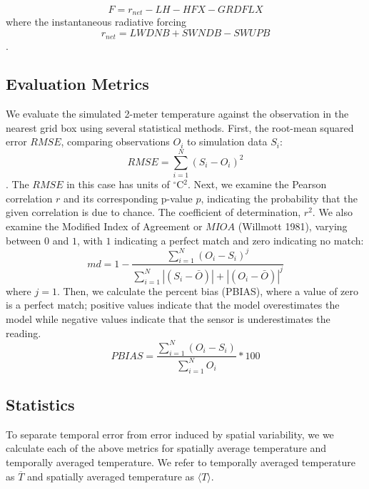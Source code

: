 \documentclass[draft,linenumbers]{agujournal}
\begin{document}
\begin{equation}
F= r_{net} -LH - HFX - GRDFLX
\end{equation}
where the instantaneous radiative forcing $$r_{net}=LWDNB + SWNDB-SWUPB$$. 
  
\subsection{Evaluation Metrics}

We evaluate the simulated 2-meter temperature against the observation in the nearest grid box using several statistical methods. First, the root-mean squared error $RMSE$, comparing observations $O_i$ to simulation data $S_i$:  
\begin{equation}%
RMSE = \sum_{i=1}^{N} \left(S_i - O_i\right)^2
\end{equation}
. The $RMSE$ in this case has units of $^\circ$C$^2$. Next, we examine the Pearson correlation $r$ and its corresponding p-value $p$, indicating the probability that the given correlation is due to chance. The coefficient of determination, $r^2$. We also examine the Modified Index of Agreement or $MIOA$ (Willmott 1981), varying between \(0\) and \(1\), with \(1\) indicating a perfect match and zero indicating no match: 
\begin{equation}
md = 1 - \frac{\sum_{i=1}^{N}(O_{i}-S_{i})^{j}}{\sum_{i=1}^{N}|(S_{i}-\bar{O})|+|(O_{i}-\bar{O})|^{j}}
\end{equation}
where $j=1$. 
Then, we calculate the percent bias (PBIAS), where a value of zero is a perfect match; positive values indicate that the model overestimates the model while negative values indicate that the sensor is underestimates the reading.
\begin{equation}
PBIAS = \frac{\sum_{i=1}^{N}(O_{i}-S_{i})}{\sum_{i=1}^{N}O_{i}}*100
\end{equation}

\subsection{Statistics}
To separate temporal error from error induced by spatial variability, we we calculate each of the above metrics for spatially average temperature and temporally averaged temperature. We refer to temporally averaged temperature as $\overline{T}$ and spatially averaged temperature as $\langle T \rangle$. 
\end{document}
